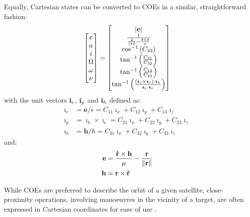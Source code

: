Equally, Cartesian states can be converted to \gls{COEs} in a similar, straightforward fashion:
\begin{equation}
	\begin{bmatrix}
		e \\ a \\ i\\ \Omega \\ \omega \\ \nu
	\end{bmatrix} = \begin{bmatrix}
			\left| \boldsymbol{\mathbf{e}} \right| \\
			\frac{1}{\frac{2}{\left\| \boldsymbol{\mathbf{r}} \right\|} - \frac{\boldsymbol{\mathbf{\dot{r}}} \times \boldsymbol{\mathbf{r}}}{\mu}} \\
			\cos^{-1}\left( C_{33}\right) \\
			\tan^{-1}\left(\frac{C_{31}}{C_{32}}\right) \\
			\tan^{-1}\left(\frac{C_{13}}{C_{23}}\right) \\
			\tan^{-1}\left(\frac{( \boldsymbol{\mathbf{\imath}}_e \times \boldsymbol{\mathbf{\imath}}_r) \cdot \boldsymbol{\mathbf{\imath}}_h}{\boldsymbol{\mathbf{\imath}}_e \cdot \boldsymbol{\mathbf{\imath}}_r}\right)
		\end{bmatrix}
\end{equation}
with the unit vectors $\boldsymbol{\mathbf{i}}_e$, $\boldsymbol{\mathbf{i}}_p$ and $\boldsymbol{\mathbf{i}}_h$ defined as:
\begin{align}
	\boldsymbol{\imath}_e &=\boldsymbol{e} / e=C_{11} \boldsymbol{\imath}_x+C_{12} \boldsymbol{\imath}_y+C_{13} \boldsymbol{\imath}_z \\
	\boldsymbol{\imath}_p &=\boldsymbol{\imath}_h \times \boldsymbol{\imath}_e=C_{21} \boldsymbol{\imath}_x+C_{22} \boldsymbol{\imath}_y+C_{23} \boldsymbol{\imath}_z \\
	\boldsymbol{\imath}_h &=\boldsymbol{h} / h=C_{31} \boldsymbol{\imath}_x+C_{32} \boldsymbol{\imath}_y+C_{33} \boldsymbol{\imath}_z
\end{align} and:
\begin{align}
	\boldsymbol{\mathbf{e}} &= \frac{\boldsymbol{\mathbf{\dot{r}}} \times \boldsymbol{\mathbf{h}}}{\mu} - \frac{\boldsymbol{\mathbf{r}}}{\left\| \boldsymbol{\mathbf{r}} \right\|} \\
	\boldsymbol{\mathbf{h}} &= \boldsymbol{\mathbf{r}} \times \boldsymbol{\mathbf{\dot{r}}}
\end{align}

While \gls{COEs} are preferred to describe the orbit of a given satellite, close-proximity operations, involving manoeuvres in the vicinity of a target, are often expressed in Cartesian coordinates for ease of use \cite{labourdette_trajectoires_2015}.


